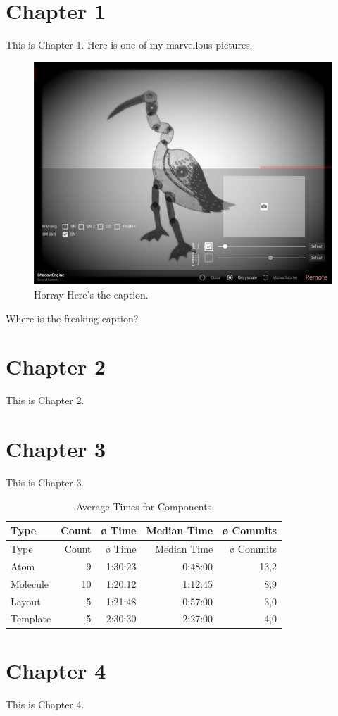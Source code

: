 \hypertarget{chapter-1}{%
\chapter{Chapter 1}\label{chapter-1}}

This is Chapter 1. Here is one of my marvellous pictures.

\begin{figure}
\centering
\includegraphics{assets/image053.jpg}
\caption{Horray Here's the caption.}
\end{figure}

Where is the freaking caption?

\hypertarget{sec:ch2}{%
\chapter{Chapter 2}\label{sec:ch2}}

This is Chapter 2.

\hypertarget{chapter-3}{%
\chapter{Chapter 3}\label{chapter-3}}

This is Chapter 3.

\hypertarget{tbl:table1}{}
\begin{longtable}[]{@{}lrrrr@{}}
\caption{\label{tbl:table1}Average Times for Components}\tabularnewline
\toprule
Type & Count & ø Time & Median Time & ø Commits\tabularnewline
\midrule
\endfirsthead
\toprule
Type & Count & ø Time & Median Time & ø Commits\tabularnewline
\midrule
\endhead
Atom & 9 & 1:30:23 & 0:48:00 & 13,2\tabularnewline
Molecule & 10 & 1:20:12 & 1:12:45 & 8,9\tabularnewline
Layout & 5 & 1:21:48 & 0:57:00 & 3,0\tabularnewline
Template & 5 & 2:30:30 & 2:27:00 & 4,0\tabularnewline
\bottomrule
\end{longtable}

\hypertarget{chapter-4}{%
\chapter{Chapter 4}\label{chapter-4}}

This is Chapter 4.

\autocite{kozelCloserPerformanceTechnologies2007}

